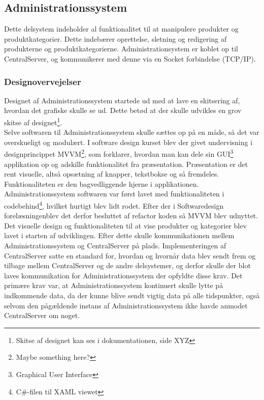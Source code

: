 \subsection{Administrationssystem}
Dette delsystem indeholder al funktionalitet til at manipulere produkter og produktkategorier. Dette indebærer oprettelse, sletning og redigering af produkterne og produktkategorierne. Administrationsystem er koblet op til CentralServer, og kommunikerer med denne via en Socket forbindelse (TCP/IP).

\subsubsection{Designovervejelser}
Designet af Administrationssystem startede ud med at lave en skitsering af, hvordan det grafiske skulle se ud. Dette betød at der skulle udvikles en grov skitse af designet\footnote{Skitse af designet kan ses i dokumentationen, side XYZ}.\\
Selve softwaren til Administrationssystem skulle sættes op på en måde, så det var overskueligt og modulært. I software design kurset blev der givet undervisning i designprincippet MVVM\footnote{Maybe something here?}, som forklarer, hvordan man kan dele sin GUI\footnote{Graphical User Interface} applikation op og adskille funktionalitet fra præsentation. Præsentation er det rent visuelle, altså opsætning af knapper, tekstbokse og så fremdeles. Funktionaliteten er den bagvedliggende hjerne i applikationen.\\
Administrationssystem softwaren var først lavet med funktionaliteten i codebehind\footnote{C\#-filen til XAML viewet}, hvilket hurtigt blev lidt rodet. Efter der i Softwaredesign forelæsningenblev det derfor besluttet af refactor koden så MVVM blev udnyttet.\\
Det visuelle design og funktionaliteten til at vise produkter og kategorier blev lavet i starten af udviklingen. Efter dette skulle kommunikationen mellem Administrationssystem og CentralServer på plads. Implementeringen af CentralServer satte en standard for, hvordan og hvornår data blev sendt frem og tilbage mellem CentralServer og de andre delsystemer, og derfor skulle der blot laves kommunikation for Administrationssystem der opfyldte disse krav. Det primære krav var, at Administrationssystem kontinuert skulle lytte på indkommende data, da der kunne blive sendt vigtig data på alle tidspunkter, også selvom den pågældende instans af Administrationssystem ikke havde anmodet CentralServer om noget.

